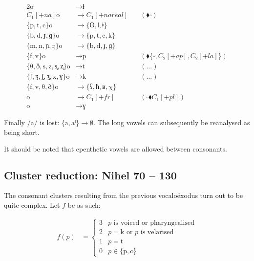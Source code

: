 \documentclass{book}
\begin{document}
\begin{alignat*}{2}
  \text{oˡ} &\rightarrow \text{ɫ} \\
  C_1[+na] \text{o} &\rightarrow C_1[+nareal] &\quad(\blacklozenge \square) \\
  \{\text{p}, \text{t}, \text{c}\} \text{o} &\rightarrow
    \{\text{ʘ}, \text{ǀ}, \text{ǂ}\} \\
  \{\text{b}, \text{d}, \text{ɟ}, \text{ɡ}\} \text{o} &\rightarrow
    \{\text{p}, \text{t}, \text{c}, \text{k}\} \\
  \{\text{m}, \text{n}, \text{ɲ}, \text{ŋ}\} \text{o} &\rightarrow
    \{\text{b}, \text{d}, \text{ɟ}, \text{ɡ}\} \\
  \{\text{f}, \text{v}\} \text{o} &\rightarrow \text{p} &\quad(\blacklozenge \{\square, C_2[+ap], C_2[+la]\}) \\
  \{\text{θ}, \text{ð}, \text{s}, \text{z}, \text{s͎}, \text{z͎}\} \text{o} &\rightarrow \text{t} &\quad(\ldots) \\
  \{\text{ʃ}, \text{ʒ}, \text{ʃ͎}, \text{ʒ͎}, \text{x}, \text{ɣ}\} \text{o} &\rightarrow \text{k} &\quad(\ldots) \\
  \{\text{f}, \text{v}, \text{θ}, \text{ð}\} \text{o} &\rightarrow
    \{\text{ʕ}, \text{ħ}, \text{ʁ}, \text{χ}\} \\
  \text{o} &\rightarrow C_1[+fr] &\quad(\square \blacklozenge C_1[+pl]) \\
  \text{o} &\rightarrow \text{ɣ}
\end{alignat*}

Finally /a/ is lost: $\{\text{a}, \text{aˡ}\} \rightarrow \emptyset$. The long vowels can subsequently be reänalysed as being short.

It should be noted that epenthetic vowels are allowed between consonants.

\subsection{Cluster reduction: Nihel 70 -- 130}

The consonant clusters resulting from the previous vocaloëxodus turn out to be quite complex. Let $f$ be as such:

\begin{align*}
  f(p) &=
  \begin{cases}
    3 & p \text{ is voiced or pharyngealised} \\
    2 & p = \text{k} \text{ or $p$ is velarised} \\
    1 & p = \text{t} \\
    0 & p \in \{\text{p}, \text{c}\}
  \end{cases}
\end{align*}
\end{document}
